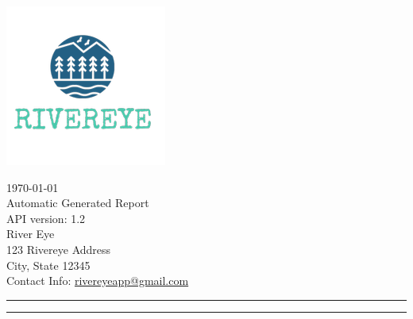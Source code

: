 \documentclass{article}
\begin{document}
    \begin{minipage}{0.6\linewidth}
    \includegraphics[width=0.7\linewidth]{LogoRiverEye.jpg}
    \end{minipage}\hfil
    \begin{minipage}{0.4\linewidth}
    \today \bigskip \\
    Automatic Generated Report \\
    API version: {1.2} \\
    River Eye \\
    123 Rivereye Address \\
    City, State 12345 \\
    Contact Info: \href{mailto:rivereyeapp@gmail.com}{rivereyeapp@gmail.com} \\

    
    \end{minipage}
    \vspace{-3em}

    \rule{\linewidth}{1pt}
    \rule{\linewidth}{1pt}

    \hfill
\end{document}
